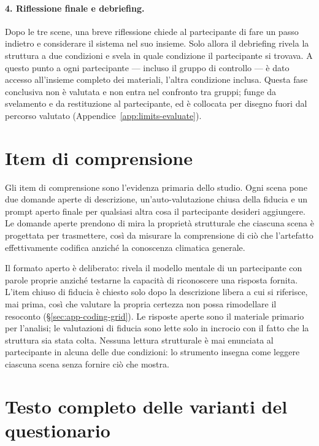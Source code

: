 \paragraph{4. Riflessione finale e debriefing.}
Dopo le tre scene, una breve riflessione chiede al partecipante di fare un passo indietro e considerare il sistema nel suo insieme. Solo allora il debriefing rivela la struttura a due condizioni e svela in quale condizione il partecipante si trovava. A questo punto a ogni partecipante --- incluso il gruppo di controllo --- è dato accesso all'insieme completo dei materiali, l'altra condizione inclusa. Questa fase conclusiva non è valutata e non entra nel confronto tra gruppi; funge da svelamento e da restituzione al partecipante, ed è collocata per disegno fuori dal percorso valutato (Appendice~\ref{app:limits-evaluate}).

\section{Item di comprensione}
\label{app:b-comprehension}

Gli item di comprensione sono l'evidenza primaria dello studio. Ogni scena pone due domande aperte di descrizione, un'auto-valutazione chiusa della fiducia e un prompt aperto finale per qualsiasi altra cosa il partecipante desideri aggiungere. Le domande aperte prendono di mira la proprietà strutturale che ciascuna scena è progettata per trasmettere, così da misurare la comprensione di ciò che l'artefatto effettivamente codifica anziché la conoscenza climatica generale.

Il formato aperto è deliberato: rivela il modello mentale di un partecipante con parole proprie anziché testarne la capacità di riconoscere una risposta fornita. L'item chiuso di fiducia è chiesto solo dopo la descrizione libera a cui si riferisce, mai prima, così che valutare la propria certezza non possa rimodellare il resoconto (\S\ref{sec:app-coding-grid}). Le risposte aperte sono il materiale primario per l'analisi; le valutazioni di fiducia sono lette solo in incrocio con il fatto che la struttura sia stata colta. Nessuna lettura strutturale è mai enunciata al partecipante in alcuna delle due condizioni: lo strumento insegna come leggere ciascuna scena senza fornire ciò che mostra.

\section{Testo completo delle varianti del questionario}
\label{app:b-fulltext}

